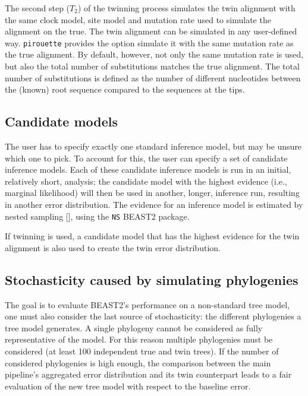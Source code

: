 The second step ($T_2$) of the twinning process simulates the twin alignment 
with the same clock model, site model and mutation rate 
used to simulate the alignment on the true. 
The twin alignment can be simulated in any user-defined way.
\verb;pirouette; provides the option simulate it with the same mutation rate as the true alignment. By default, however,
not only the same mutation rate is used, but also the total number of 
substitutions
matches the true alignment. The total number of substitutions is defined
as the number of different nucleotides between the (known) root sequence
compared to the sequences at the tips.

\subsection{Candidate models}
\label{subsec:candidates}

The user has to specify exactly one standard inference model,
but may be unsure which one to pick. To account for this, the user can
specify a set of candidate inference models. Each of these candidate inference models is run in an initial, relatively short, analysis; the candidate model with the highest 
evidence (i.e., marginal likelihood) will then be
used in another, longer, inference run, resulting in another error distribution.
The evidence for an inference model is estimated by nested 
sampling [\cite{russel2019model}], using the \verb;NS; BEAST2 package. 

If twinning is used, a candidate model that has the highest evidence for
the twin alignment is also used to create the twin error
distribution.

\subsection{Stochasticity caused by simulating phylogenies}
\label{subsec:stochasticity}

The goal is to evaluate BEAST2's performance 
on a non-standard tree model, 
one must also consider the last source of stochasticity: 
the different phylogenies a tree model generates.
A single phylogeny cannot be considered as fully representative of the model. 
For this reason multiple phylogenies must be 
considered (at least 100 independent true and twin trees).
If the number of considered phylogenies is high enough, 
the comparison between the main pipeline's aggregated error distribution 
and its twin counterpart leads to a fair evaluation 
of the new tree model with respect to the baseline error.

